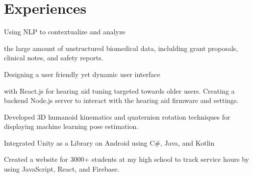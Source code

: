 \documentclass[]{main}
\begin{document}
\begin{minipage}[t]{0.66\textwidth} 

\section{Experiences}

\vspace{10pt}
\begin{tightemize}
    \item Using NLP to contextualize and analyze 
    \item the large amount of unstructured biomedical data, inclulding grant proposals, clinical notes, and safety reports.
\end{tightemize}
\sectionsep

\begin{tightemize}
    \item Designing a user friendly yet dynamic user interface
    \item with React.js for hearing aid tuning targeted towards older users. Creating a backend Node.js server to interact with the hearing aid firmware and settings.
\end{tightemize}
\sectionsep

\begin{tightemize}
    \item Developed 3D humanoid kinematics and quaternion rotation techniques
for displaying machine learning pose estimation.
    \item Integrated Unity as a Library on Android using C\#, Java, and Kotlin
\end{tightemize}
\sectionsep

\begin{tightemize}
    \item Created a website for 3000+ students at my high school to track service hours by using JavaScript, React, and Firebase.
\end{tightemize}
\sectionsep


\end{minipage}
\end{document}
